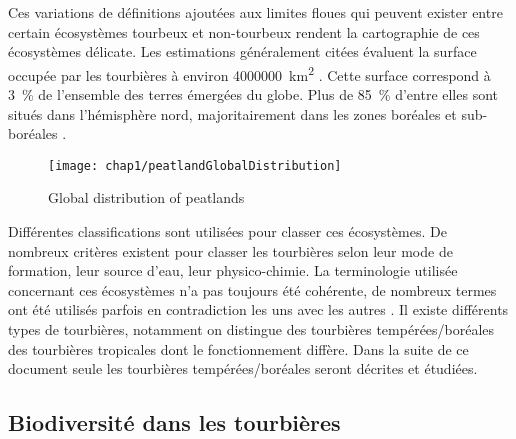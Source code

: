 Ces variations de définitions ajoutées aux limites floues qui peuvent exister entre certain écosystèmes tourbeux et non-tourbeux rendent la cartographie de ces écosystèmes délicate.
Les estimations généralement citées évaluent la surface occupée par les tourbières à environ \SI{4000000}{\square\kilo\meter} \cite{lappalainen1996}. 
Cette surface correspond à \SI{3}{\percent} de l'ensemble des terres émergées du globe.
Plus de \SI{85}{\percent} d'entre elles sont situés dans l'hémisphère nord, majoritairement dans les zones boréales et sub-boréales \cite{society2008}.

\begin{figure}
\centering
\texttt{[image: chap1/peatlandGlobalDistribution]}
\caption{Global distribution of peatlands}
\label{fig:peatlandGlobalDistribution} 
\end{figure}

Différentes classifications sont utilisées pour classer ces écosystèmes.
De nombreux critères existent pour classer les tourbières selon leur mode de formation, leur source d'eau, leur physico-chimie.
La terminologie utilisée concernant ces écosystèmes n'a pas toujours été cohérente, de nombreux termes ont été utilisés parfois en contradiction les uns avec les autres \cite{joosten2002}.
Il existe différents types de tourbières, notamment on distingue des tourbières tempérées/boréales des tourbières tropicales dont le fonctionnement diffère.
Dans la suite de ce document seule les tourbières tempérées/boréales seront décrites et étudiées.

\subsection{Biodiversité dans les tourbières}


